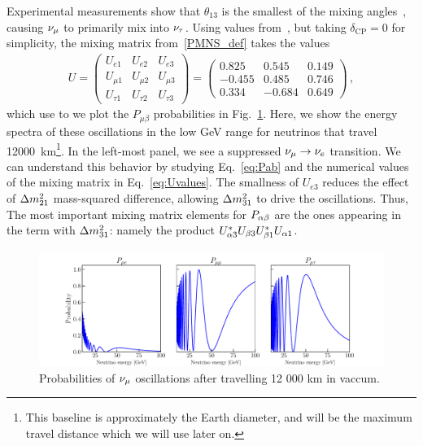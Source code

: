 Experimental measurements show that $\theta_{13}$ is the smallest of the mixing angles~\cite{nufit}, causing 
$\nu_\mu$ to primarily mix into $\nu_\tau$. Using values from~\cite{nufit}, but taking $\delta_\mathrm{CP} = 0$ for simplicity,
the mixing matrix from~\ref{PMNS_def} takes the values
\begin{align}\label{eq:Uvalues}
   U = \begin{pmatrix}
       U_{e 1} & U_{e2} & U_{e3} \\
       U_{\mu 1} & U_{\mu 2} & U_{\mu 3} \\
       U_{\tau 1} & U_{\tau 2} & U_{\tau 3}
   \end{pmatrix} 
   = \begin{pmatrix}
       0.825 & 0.545 & 0.149 \\
       -0.455 & 0.485 & 0.746 \\
       0.334 & -0.684 & 0.649
   \end{pmatrix} \,,
\end{align}
which use to we plot the $P_{\mu \beta}$ probabilities in Fig.~\ref{fig:vac_osc}. Here, we show the energy spectra of these oscillations in the low \si{\GeV} range for neutrinos that travel \SI{12000}{\km}\footnote{This baseline
is approximately the Earth diameter, and will be the maximum travel distance which we will use later on.}.
In the left-most panel, we see a suppressed $\nu_\mu \to \nu_e$ transition. We can understand this behavior by studying Eq.~\ref{eq:Pab} and the 
numerical values of the mixing matrix in Eq.~\ref{eq:Uvalues}.
The smallness of $U_{e3}$ reduces the effect of $\dm[21]$ mass-squared difference,
allowing $\dm[31]$ to drive the oscillations. Thus, 
The most important mixing matrix elements for $P_{\alpha\beta}$ are the ones appearing in the term with $\dm[31]$:
namely the product $U_{\alpha3}^*U_{\beta3} U_{\beta1}^*U_{\alpha1}$.

\begin{figure}[!h]
    \begin{center}
    \includegraphics[width=1\textwidth]{figures/vac_osc.pdf}
    \caption{Probabilities of $\nu_\mu$ oscillations after travelling 12 000 km in vaccum.}\label{fig:vac_osc}
    \end{center}
\end{figure}


